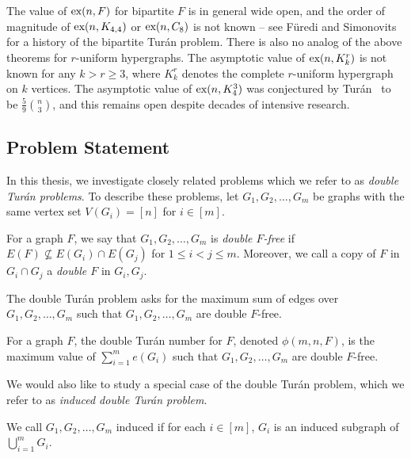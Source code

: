 The value of $\textnormal{ex}(n, F)$ for bipartite $F$ is in general wide open, and the order of magnitude of $\textnormal{ex}(n, K_{4, 4})$ or $\textnormal{ex}(n, C_8)$ is not known -- see F\"{u}redi and Simonovits~\cite{FurediSimonovits2013} for a history of the bipartite Tur\'{a}n problem. There is also no analog of the above theorems for $r$-uniform hypergraphs. The asymptotic value of $\textnormal{ex}(n, K_k^r)$ is not known for any $k > r \geq 3$, where $K_k^r$ denotes the complete $r$-uniform hypergraph on $k$ vertices. The asymptotic value of $\textnormal{ex}(n, K_4^3)$ was conjectured by Tur\'{a}n~\cite{Turan1941} to be $\frac{5}{9} \binom{n}{3}$, and this remains open despite decades of intensive research. 

\subsection{Problem Statement}

In this thesis, we investigate closely related problems which we refer to as \textit{double Tur\'{a}n problems}. To describe these problems, let $G_1, G_2, \ldots, G_m$ be graphs with the same vertex set $V(G_i) = [n]$ for $i \in [m]$. 

\begin{definition}
  For a graph $F$, we say that $G_1, G_2, \dots, G_m$ is \textit{double $F$-free} if $E(F) \not \subseteq E(G_i) \cap E(G_j)$ for $1 \leq i < j \leq m$. Moreover, we call a copy of $F$ in $G_i \cap G_j$ a \textit{double $F$} in $G_i, G_j$.
\end{definition}

The double Tur\'{a}n problem asks for the maximum sum of edges over $G_1, G_2, \ldots, G_m$ such that $G_1, G_2, \ldots, G_m$ are double $F$-free.

\begin{definition}
  For a graph $F$, the double Turán number for $F$, denoted $\phi(m, n, F)$, is the maximum value of $\sum_{i = 1}^m e(G_i)$ such that $G_1, G_2, \dots, G_m$ are double $F$-free.
\end{definition}

We would also like to study a special case of the double Tur\'{a}n problem, which we refer to as \textit{induced double Tur\'{a}n problem}. 

\begin{definition}
  We call $G_1, G_2, \ldots, G_m$ induced if for each $i \in [m]$, $G_i$ is an induced subgraph of $\bigcup_{i = 1}^m G_i$.
\end{definition}

